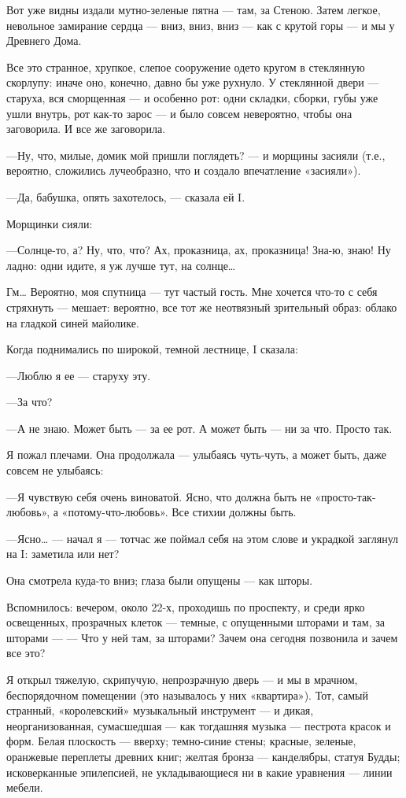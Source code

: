 \documentclass[11pt,openany]{book}
\begin{document}
Вот уже видны издали мутно-зеленые пятна --- там, за Стеною. Затем легкое, невольное замирание сердца --- вниз, вниз, вниз --- как с крутой горы --- и мы у Древнего Дома.

Все это странное, хрупкое, слепое сооружение одето кругом в стеклянную скорлупу: иначе оно, конечно, давно бы уже рухнуло. У стеклянной двери --- старуха, вся сморщенная --- и особенно рот: одни складки, сборки, губы уже ушли внутрь, рот как-то зарос --- и было совсем невероятно, чтобы она заговорила. И все же заговорила.

---Ну, что, милые, домик мой пришли поглядеть? --- и морщины засияли (т.е., вероятно, сложились лучеобразно, что и создало впечатление «засияли»).

---Да, бабушка, опять захотелось, --- сказала ей I.

Морщинки сияли:

---Солнце-то, а? Ну, что, что? Ах, проказница, ах, проказница! Зна-ю, знаю! Ну ладно: одни идите, я уж лучше тут, на солнце\ldots{}

Гм\ldots{} Вероятно, моя спутница --- тут частый гость. Мне хочется что-то с себя стряхнуть --- мешает: вероятно, все тот же неотвязный зрительный образ: облако на гладкой синей майолике.

Когда поднимались по широкой, темной лестнице, I сказала:

---Люблю я ее --- старуху эту.

---За что?

---А не знаю. Может быть --- за ее рот. А может быть --- ни за что. Просто так.

Я пожал плечами. Она продолжала --- улыбаясь чуть-чуть, а может быть, даже совсем не улыбаясь:

---Я чувствую себя очень виноватой. Ясно, что должна быть не «просто-так-любовь», а «потому-что-любовь». Все стихии должны быть.

---Ясно\ldots{} --- начал я --- тотчас же поймал себя на этом слове и украдкой заглянул на I: заметила или нет?

Она смотрела куда-то вниз; глаза были опущены --- как шторы.

Вспомнилось: вечером, около 22-х, проходишь по проспекту, и среди ярко освещенных, прозрачных клеток --- темные, с опущенными шторами и там, за шторами --- --- Что у ней там, за шторами? Зачем она сегодня позвонила и зачем все это?

Я открыл тяжелую, скрипучую, непрозрачную дверь --- и мы в мрачном, беспорядочном помещении (это называлось у них «квартира»). Тот, самый странный, «королевский» музыкальный инструмент --- и дикая, неорганизованная, сумасшедшая --- как тогдашняя музыка --- пестрота красок и форм. Белая плоскость --- вверху; темно-синие стены; красные, зеленые, оранжевые переплеты древних книг; желтая бронза --- канделябры, статуя Будды; исковерканные эпилепсией, не укладывающиеся ни в какие уравнения --- линии мебели.
\end{document}
